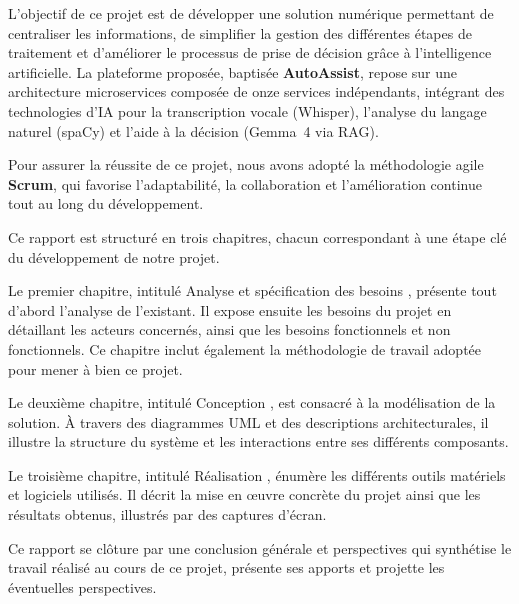 \indent L'objectif de ce projet est de d\'{e}velopper une solution num\'{e}rique permettant de centraliser les informations, de simplifier la gestion des diff\'{e}rentes \'{e}tapes de traitement et d'am\'{e}liorer le processus de prise de d\'{e}cision gr\^{a}ce \`{a} l'intelligence artificielle. La plateforme propos\'{e}e, baptis\'{e}e \textbf{AutoAssist}, repose sur une architecture microservices compos\'{e}e de onze services ind\'{e}pendants, int\'{e}grant des technologies d'IA pour la transcription vocale (Whisper), l'analyse du langage naturel (spaCy) et l'aide \`{a} la d\'{e}cision (Gemma~4 via RAG).

\indent Pour assurer la r\'{e}ussite de ce projet, nous avons adopt\'{e} la m\'{e}thodologie agile \textbf{Scrum}, qui favorise l'adaptabilit\'{e}, la collaboration et l'am\'{e}lioration continue tout au long du d\'{e}veloppement.

\indent Ce rapport est structur\'{e} en trois chapitres, chacun correspondant \`{a} une \'{e}tape cl\'{e} du d\'{e}veloppement de notre projet.

\indent Le premier chapitre, intitul\'{e} \og Analyse et sp\'{e}cification des besoins \fg{}, pr\'{e}sente tout d'abord l'analyse de l'existant. Il expose ensuite les besoins du projet en d\'{e}taillant les acteurs concern\'{e}s, ainsi que les besoins fonctionnels et non fonctionnels. Ce chapitre inclut \'{e}galement la m\'{e}thodologie de travail adopt\'{e}e pour mener \`{a} bien ce projet.

\indent Le deuxi\`{e}me chapitre, intitul\'{e} \og Conception \fg{}, est consacr\'{e} \`{a} la mod\'{e}lisation de la solution. \`{A} travers des diagrammes UML et des descriptions architecturales, il illustre la structure du syst\`{e}me et les interactions entre ses diff\'{e}rents composants.

\indent Le troisi\`{e}me chapitre, intitul\'{e} \og R\'{e}alisation \fg{}, \'{e}num\`{e}re les diff\'{e}rents outils mat\'{e}riels et logiciels utilis\'{e}s. Il d\'{e}crit la mise en \oe uvre concr\`{e}te du projet ainsi que les r\'{e}sultats obtenus, illustr\'{e}s par des captures d'\'{e}cran.

\indent Ce rapport se cl\^{o}ture par une conclusion g\'{e}n\'{e}rale et perspectives qui synth\'{e}tise le travail r\'{e}alis\'{e} au cours de ce projet, pr\'{e}sente ses apports et projette les \'{e}ventuelles perspectives.

